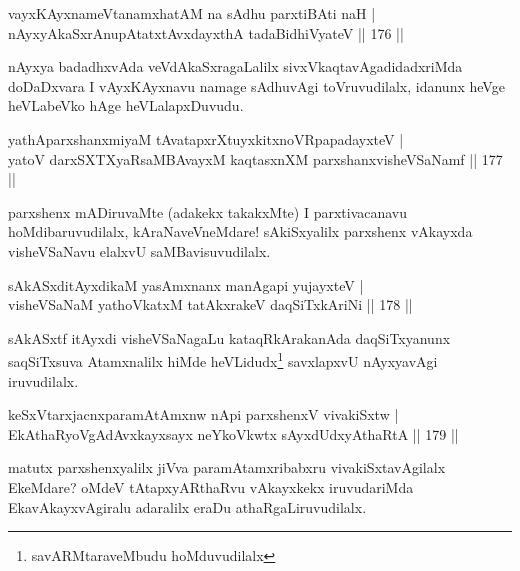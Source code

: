
\begin{shl}
vayxKAyxnameVtanamxhatAM na sAdhu parxtiBAti naH |\\
nAyxyAkaSxrAnupAtatxtAvxdayxthA tadaBidhiVyateV \hfill || 176 ||
\end{shl}

\begin{artha}
nAyxya badadhxvAda veVdAkaSxragaLalilx sivxVkaqtavAgadidadxriMda doDaDxvara I vAyxKAyxnavu namage sAdhuvAgi toVruvudilalx, idanunx heVge heVLabeVko hAge heVLalapxDuvudu.
\end{artha}


\begin{shl}
yathAparxshanxmiyaM tAvatapxrXtuyxkitxnoVRpapadayxteV |\\
yatoV darxSXTXyaRsaMBAvayxM kaqtasxnXM parxshanxvisheVSaNamf \hfill || 177 ||
\end{shl}

\begin{artha}
parxshenx mADiruvaMte (adakekx takakxMte) I parxtivacanavu hoMdibaruvudilalx, kAraNaveVneMdare! sAkiSxyalilx parxshenx vAkayxda visheVSaNavu elalxvU saMBavisuvudilalx.
\end{artha}


\begin{shl}
sAkASxditAyxdikaM yasAmxnanx manAgapi yujayxteV |\\
visheVSaNaM yathoVkatxM tatAkxrakeV daqSiTxkAriNi \hfill || 178 ||
\end{shl}

\begin{artha}
sAkASxtf itAyxdi visheVSaNagaLu kataqRkArakanAda daqSiTxyanunx saqSiTxsuva Atamxnalilx hiMde heVLidudx\footnote{savARMtaraveMbudu hoMduvudilalx} savxlapxvU nAyxyavAgi iruvudilalx.
\end{artha}

\begin{shl}
keSxVtarxjacnxparamAtAmxnw nApi parxshenxV vivakiSxtw |\\
EkAthaRyoVgAdAvxkayxsayx neYkoVkwtx sAyxdUdxyAthaRtA \hfill || 179 ||
\end{shl}

\begin{artha}%
matutx parxshenxyalilx jiVva paramAtamxribabxru vivakiSxtavAgilalx EkeMdare? oMdeV tAtapxyARthaRvu vAkayxkekx iruvudariMda EkavAkayxvAgiralu adaralilx eraDu athaRgaLiruvudilalx.
\end{artha}

